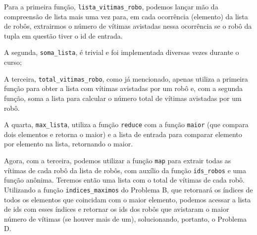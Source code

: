 Para a primeira função, \texttt{lista\_vitimas\_robo}, podemos lançar mão da compreensão de lista mais uma vez para, em cada ocorrência (elemento) da lista de robôs, extrairmos o número de vítimas avistadas nessa ocorrência se o robô da tupla em questão tiver o id de entrada.

A segunda, \texttt{soma\_lista}, é trivial e foi implementada diversas vezes durante o curso;

A terceira, \texttt{total\_vitimas\_robo}, como já mencionado, apenas utiliza a primeira função para obter a lista com vítimas avistadas por um robô e, com a segunda função, soma a lista para calcular o número total de vítimas avistadas por um robô.

A quarta, \texttt{max\_lista}, utiliza a função \texttt{reduce} com a função \texttt{maior} (que compara dois elementos e retorna o maior) e a lista de entrada para comparar elemento por elemento na lista, retornando o maior.

Agora, com a terceira, podemos utilizar a função \texttt{map} para extrair todas as vítimas de cada robô da lista de robôs, com auxílio da função \texttt{ids\_robos} e uma função anônima. Teremos então uma lista com o total de vítimas de cada robô. Utilizando a função \texttt{indices\_maximos} do Problema B, que retornará os índices de todos os elementos que coincidam com o maior elemento, podemos acessar a lista de ids com esses índices e retornar os ids dos robôs que avistaram o maior número de vítimas (se houver mais de um), solucionando, portanto, o Problema D.
